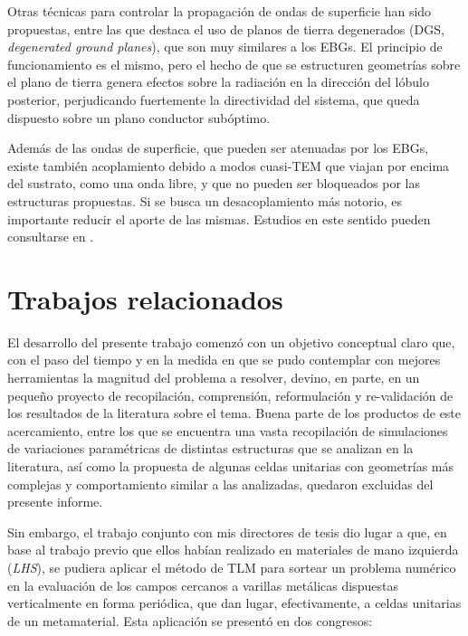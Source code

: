 Otras técnicas para controlar la propagación de ondas de superficie han sido propuestas, entre las que destaca el uso de planos de tierra degenerados (DGS, \textit{degenerated ground planes}), que son muy similares a los EBGs. El principio de funcionamiento es el mismo, pero el hecho de que se estructuren geometrías sobre el plano de tierra genera efectos sobre la radiación en la dirección del lóbulo posterior, perjudicando fuertemente la directividad del sistema, que queda dispuesto sobre un plano conductor subóptimo.

Además de las ondas de superficie, que pueden ser atenuadas por los EBGs, existe también acoplamiento debido a modos cuasi-TEM que viajan por encima del sustrato, como una onda libre, y que no pueden ser bloqueados por las estructuras propuestas. Si se busca un desacoplamiento más notorio, es importante reducir el aporte de las mismas. Estudios en este sentido pueden consultarse en \cite{Asimonis:designoptimization}.

\section{Trabajos relacionados}

El desarrollo del presente trabajo comenzó con un objetivo conceptual claro que, con el paso del tiempo y en la medida en que se pudo contemplar con mejores herramientas la magnitud del problema a resolver, devino, en parte, en un pequeño proyecto de recopilación, comprensión, reformulación y re-validación de los resultados de la literatura sobre el tema. Buena parte de los productos de este acercamiento, entre los que se encuentra una vasta recopilación de simulaciones de variaciones paramétricas de distintas estructuras que se analizan en la literatura, así como la propuesta de algunas celdas unitarias con geometrías más complejas y comportamiento similar a las analizadas, quedaron excluidas del presente informe.

Sin embargo, el trabajo conjunto con mis directores de tesis dio lugar a que, en base al trabajo previo que ellos habían realizado en materiales de mano izquierda (\textit{LHS}), se pudiera aplicar el método de TLM para sortear un problema numérico en la evaluación de los campos cercanos a varillas metálicas dispuestas verticalmente en forma periódica, que dan lugar, efectivamente, a celdas unitarias de un metamaterial. Esta aplicación se presentó en dos congresos:

